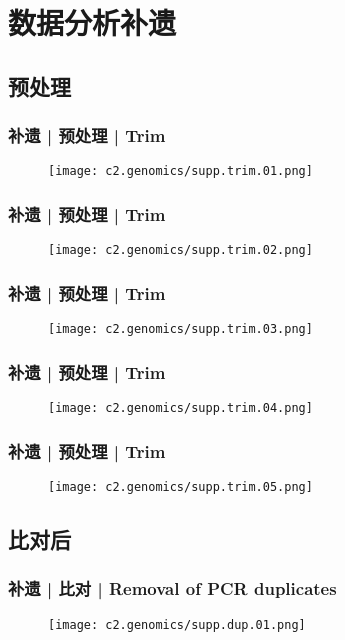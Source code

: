 \section{数据分析补遗}
\subsection{预处理}
\begin{frame}
  \frametitle{补遗 | 预处理 | Trim}
  \begin{figure}
    \centering
    \texttt{[image: c2.genomics/supp.trim.01.png]}
  \end{figure}
\end{frame}

\begin{frame}
  \frametitle{补遗 | 预处理 | Trim}
  \begin{figure}
    \centering
    \texttt{[image: c2.genomics/supp.trim.02.png]}
  \end{figure}
\end{frame}

\begin{frame}
  \frametitle{补遗 | 预处理 | Trim}
  \begin{figure}
    \centering
    \texttt{[image: c2.genomics/supp.trim.03.png]}
  \end{figure}
\end{frame}

\begin{frame}
  \frametitle{补遗 | 预处理 | Trim}
  \begin{figure}
    \centering
    \texttt{[image: c2.genomics/supp.trim.04.png]}
  \end{figure}
\end{frame}

\begin{frame}
  \frametitle{补遗 | 预处理 | Trim}
  \begin{figure}
    \centering
    \texttt{[image: c2.genomics/supp.trim.05.png]}
  \end{figure}
\end{frame}

\subsection{比对后}
\begin{frame}
  \frametitle{补遗 | 比对 | Removal of PCR duplicates}
  \begin{figure}
    \centering
    \texttt{[image: c2.genomics/supp.dup.01.png]}
  \end{figure}
\end{frame}

